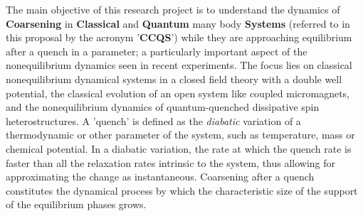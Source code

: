 \documentclass[a4paper,11pt]{article}
\begin{document}
The main objective of this research project is to understand the dynamics of \textbf{Coarsening} in \textbf{Classical} and \textbf{Quantum} many body \textbf{Systems}
(referred to in this proposal by the acronym '\textbf{CCQS}') while they are approaching equilibrium after a quench in a  {parameter}; a particularly important aspect of the nonequilibrium dynamics seen in recent experiments. The focus lies on classical nonequilibrium dynamical systems in a closed field theory with a double well potential, the classical evolution of an open system like coupled micromagnets, and the nonequilibrium dynamics of quantum-quenched dissipative spin heterostructures. A 'quench' is defined as the \textit{diabatic} variation of a thermodynamic or other  {parameter} of the system, such as temperature, mass or chemical potential. In a diabatic variation, the rate at which the quench rate is faster than all the relaxation rates intrinsic to the system, thus allowing for approximating the change as instantaneous. 
Coarsening after a quench constitutes the dynamical process by which the characteristic  {size} of the support of the equilibrium phases grows.
\end{document}
